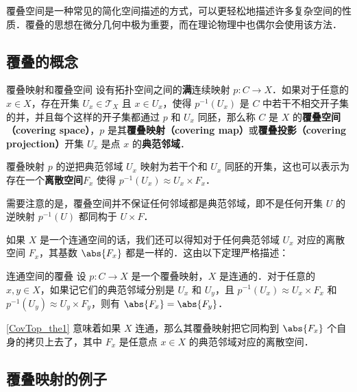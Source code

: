 

覆叠空间是一种常见的简化空间描述的方式，可以更轻松地描述许多复杂空间的性质．覆叠的思想在微分几何中极为重要，而在理论物理中也偶尔会使用该方法．

\subsection{覆叠的概念}
\begin{definition}{覆叠映射和覆叠空间}\label{CovTop_def1}
设有拓扑空间之间的\textbf{满}连续映射 $p:C\rightarrow X$．如果对于任意的 $x\in X$，存在开集 $U_x\in\mathcal{T}_X$ 且 $x\in U_x$，使得 $p^{-1}(U_x)$ 是 $C$ 中若干不相交开子集的并，并且每个这样的开子集都通过 $p$ 和 $U_x$ 同胚，那么称 $C$ 是 $X$ 的\textbf{覆叠空间（covering space）}，$p$ 是其\textbf{覆叠映射（covering map）}或\textbf{覆叠投影（covering projection）}开集 $U_x$ 是点 $x$ 的\textbf{典范邻域}．
\end{definition} 

覆叠映射 $p$ 的逆把典范邻域 $U_x$ 映射为若干个和 $U_x$ 同胚的开集，这也可以表示为存在一个\textbf{离散空间}$F_x$ 使得 $p^{-1}(U_x)\approx U_x\times F_x$．

需要注意的是，覆叠空间并不保证任何邻域都是典范邻域，即不是任何开集 $U$ 的逆映射 $p^{-1}(U)$ 都同构于 $U\times F$．

如果 $X$ 是一个连通空间的话，我们还可以得知对于任何典范邻域 $U_x$ 对应的离散空间 $F_x$，其基数 $\abs{F_x}$ 都是一样的．这由以下定理严格描述：

\begin{theorem}{连通空间的覆叠}\label{CovTop_the1}
设 $p:C\rightarrow X$ 是一个覆叠映射，$X$ 是连通的．对于任意的 $x, y\in X$，如果记它们的典范邻域分别是 $U_x$ 和 $U_y$，且 $p^{-1}(U_x)\approx U_x\times F_x$ 和 $p^{-1}(U_y)\approx U_y\times F_y$，则有 $\abs{F_x}=\abs{F_y}$．
\end{theorem}

\autoref{CovTop_the1} 意味着如果 $X$ 连通，那么其覆叠映射把它同构到 $\abs{F_x}$ 个自身的拷贝上去了，其中 $F_x$ 是任意点 $x\in X$ 的典范邻域对应的离散空间．

\subsection{覆叠映射的例子}

